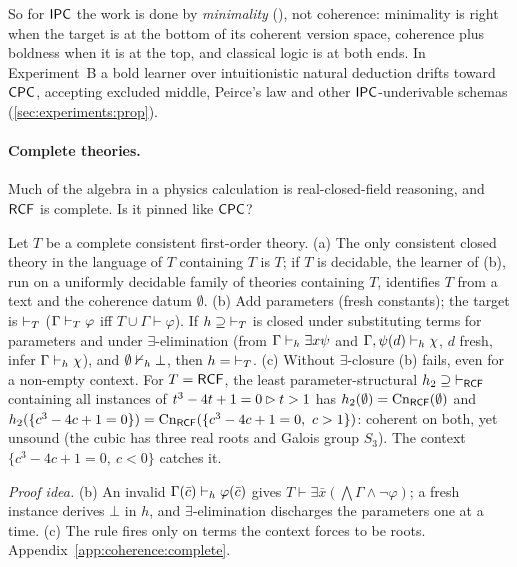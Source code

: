 So for $\mathsf{IPC}$ the work is done by \emph{minimality} (), not coherence: minimality is right when the target is at the bottom of its coherent version space, coherence plus boldness when it is at the top, and classical logic is at both ends. In Experiment~B a bold learner over intuitionistic natural deduction drifts toward $\mathsf{CPC}$, accepting excluded middle, Peirce's law and other $\mathsf{IPC}$-underivable schemas (\cref{sec:experiments:prop}).

\paragraph{Complete theories.} Much of the algebra in a physics calculation is real-closed-field reasoning, and $\mathsf{RCF}$ is complete. Is it pinned like $\mathsf{CPC}$?

\begin{proposition}\label{prop:coherence:complete}
Let $T$ be a complete consistent first-order theory.
\textup{(a)} The only consistent closed theory in the language of $T$ containing $T$ is $T$; if $T$ is decidable, the learner of (b), run on a uniformly decidable family of theories containing $T$, identifies $T$ from a text and the coherence datum $\emptyset$.
\textup{(b)} Add parameters (fresh constants); the target is $\vdash_T$ ($\Gamma\vdash_T\varphi$ iff $T\cup\Gamma\vdash\varphi$). If $h\supseteq{\vdash_T}$ is closed under substituting terms for parameters and under $\exists$-elimination (from $\Gamma\vdash_h\exists x\psi$ and $\Gamma,\psi(d)\vdash_h\chi$, $d$ fresh, infer $\Gamma\vdash_h\chi$), and $\emptyset\nvdash_h\bot$, then $h={\vdash_T}$.
\textup{(c)} Without $\exists$-closure (b) fails, even for a non-empty context. For $T=\mathsf{RCF}$, the least parameter-structural $h_2\supseteq{\vdash_{\mathsf{RCF}}}$ containing all instances of $t^3-4t+1=0\rhd t>1$ has $h_2(\emptyset)=\mathrm{Cn}_{\mathsf{RCF}}(\emptyset)$ and $h_2(\{c^3-4c+1=0\})=\Cn_{\RCF}(\{c^3-4c+1=0,\ c>1\})$: coherent on both, yet unsound (the cubic has three real roots and Galois group $S_3$). The context $\{c^3-4c+1=0,\ c<0\}$ catches it.
\end{proposition}

\noindent\emph{Proof idea.} (b) An invalid $\Gamma(\bar c)\vdash_h\varphi(\bar c)$ gives $T\vdash\exists\bar x(\bigwedge\Gamma\wedge\neg\varphi)$; a fresh instance derives $\bot$ in $h$, and $\exists$-elimination discharges the parameters one at a time. (c) The rule fires only on terms the context forces to be roots. Appendix~\ref{app:coherence:complete}.

